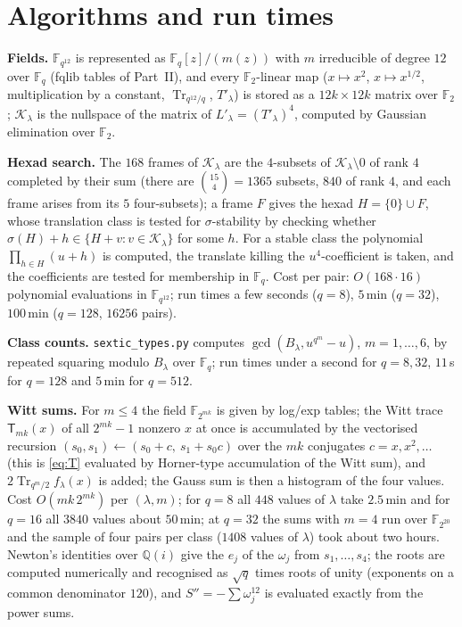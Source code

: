\documentclass[12pt,a4paper]{amsart}
\theoremstyle{definition}
\newcommand{\F}{\mathbb{F}}
\newcommand{\Q}{\mathbb{Q}}
\newcommand{\Tr}{\operatorname{Tr}}
\newcommand{\Kk}{\mathcal{K}}
\newcommand{\Spp}{S''}
\begin{document}
\section{Algorithms and run times}\label{app:algo}
\textbf{Fields.} $\F_{q^{12}}$ is represented as $\F_q[z]/(m(z))$ with $m$ irreducible of degree $12$ over $\F_q$ (fqlib tables of Part~II), and every $\F_2$-linear map ($x\mapsto x^2$, $x\mapsto x^{1/2}$, multiplication by a constant, $\Tr_{q^{12}/q}$, $T'_\lambda$) is stored as a $12k\times12k$ matrix over $\F_2$; $\Kk_\lambda$ is the nullspace of the matrix of $L'_\lambda=(T'_\lambda)^4$, computed by Gaussian elimination over $\F_2$.

\textbf{Hexad search.} The $168$ frames of $\Kk_\lambda$ are the $4$-subsets of $\Kk_\lambda\setminus0$ of rank $4$ completed by their sum (there are $\binom{15}4=1365$ subsets, $840$ of rank $4$, and each frame arises from its $5$ four-subsets); a frame $F$ gives the hexad $H=\{0\}\cup F$, whose translation class is tested for $\sigma$-stability by checking whether $\sigma(H)+h\in\{H+v:v\in\Kk_\lambda\}$ for some $h$. For a stable class the polynomial $\prod_{h\in H}(u+h)$ is computed, the translate killing the $u^4$-coefficient is taken, and the coefficients are tested for membership in $\F_q$. Cost per pair: $O(168\cdot16)$ polynomial evaluations in $\F_{q^{12}}$; run times a few seconds ($q=8$), $5$\,min ($q=32$), $100$\,min ($q=128$, $16256$ pairs).

\textbf{Class counts.} \texttt{sextic\_types.py} computes $\gcd(B_\lambda,u^{q^m}-u)$, $m=1,\dots,6$, by repeated squaring modulo $B_\lambda$ over $\F_q$; run times under a second for $q=8,32$, $11$\,s for $q=128$ and $5$\,min for $q=512$.

\textbf{Witt sums.} For $m\le4$ the field $\F_{2^{mk}}$ is given by log/exp tables; the Witt trace $\mathsf T_{mk}(x)$ of all $2^{mk}-1$ nonzero $x$ at once is accumulated by the vectorised recursion $(s_0,s_1)\leftarrow(s_0+c,\ s_1+s_0c)$ over the $mk$ conjugates $c=x,x^2,\dots$ (this is \eqref{eq:T} evaluated by Horner-type accumulation of the Witt sum), and $2\Tr_{q^m/2}f_\lambda(x)$ is added; the Gauss sum is then a histogram of the four values. Cost $O(mk\,2^{mk})$ per $(\lambda,m)$; for $q=8$ all $448$ values of $\lambda$ take $2.5$\,min and for $q=16$ all $3840$ values about $50$\,min; at $q=32$ the sums with $m=4$ run over $\F_{2^{20}}$ and the sample of four pairs per class ($1408$ values of $\lambda$) took about two hours. Newton's identities over $\Q(i)$ give the $e_j$ of the $\omega_j$ from $s_1,\dots,s_4$; the roots are computed numerically and recognised as $\sqrt q$ times roots of unity (exponents on a common denominator $120$), and $\Spp=-\sum\omega_j^{12}$ is evaluated exactly from the power sums.
\end{document}
